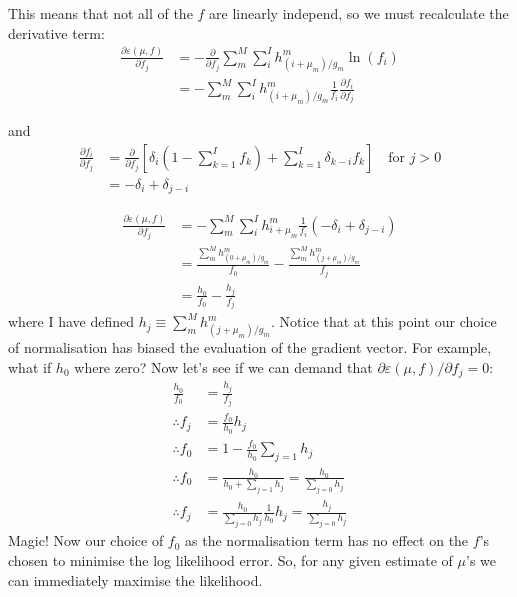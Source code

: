 \documentclass[11pt]{article}
\begin{document}
This means that not all of the $f$ are linearly independ, so we must recalculate the derivative term:
\begin{align}
   \frac{\partial \varepsilon(\mu, f)}{\partial f_j} &= -\frac{\partial}{\partial f_j} \sum_m^M \sum_i^I h^m_{(i+\mu_m)/g_m} \ln(f_i) \\
   &= - \sum_m^M \sum_i^I h^m_{(i+\mu_m)/g_m} \frac{1}{f_i} \frac{\partial f_i}{\partial f_j}
\end{align}

and
\begin{align}
   \frac{\partial f_i}{\partial f_j} &= \frac{\partial }{\partial f_j} \left[ \delta_{i} (1 - \sum_{k=1}^I f_k) + \sum_{k=1}^I \delta_{k-i} f_k \right] \quad \text{for } j > 0 \\
   &= -\delta_{i} + \delta_{j-i}
\end{align}

\begin{align}
   \frac{\partial \varepsilon(\mu, f)}{\partial f_j} &=- \sum_m^M \sum_i^I h^m_{i+\mu_m} \frac{1}{f_i} (-\delta_{i} + \delta_{j-i}) \\
   &= \frac{ \sum_m^M h^m_{(0+\mu_m)/g_m}}{f_0} - \frac{ \sum_m^M h^m_{(j+\mu_m)/g_m}}{f_j} \\
   &= \frac{ h_{0}}{f_0} - \frac{ h_{j}}{f_j}
\end{align}
where I have defined $h_j \equiv \sum_m^M h^m_{(j+\mu_m)/g_m}$. Notice that at this point our choice of normalisation has biased the evaluation of the gradient vector. For example, what if $h_0$ where zero? Now let's see if we can demand that $\partial \varepsilon(\mu, f) / \partial f_j = 0$:
\begin{align}
   \frac{ h_{0}}{f_0} &= \frac{ h_{j}}{f_j} \\
   \therefore f_j &= \frac{f_0}{h_0} h_j \\
   \therefore f_0 &= 1 -  \frac{f_0}{h_0} \sum_{j=1} h_j \\
   \therefore f_0 &= \frac{h_0}{h_0 + \sum_{j=1} h_j} = \frac{h_0}{\sum_{j=0} h_j} \\
   \therefore f_j &= \frac{h_0}{\sum_{j=0} h_j} \frac{1}{h_0} h_j = \frac{h_j}{\sum_{j=0} h_j}
\end{align}
Magic! Now our choice of $f_0$ as the normalisation term has no effect on the $f$'s chosen to minimise the log likelihood error. So, for any given estimate of $\mu$'s we can immediately maximise the likelihood. 
\end{document}
